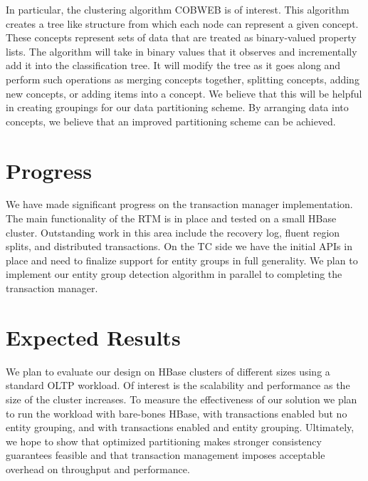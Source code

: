\documentclass[10pt,final,journal]{IEEEtran}
\begin{document}
In particular, the clustering algorithm COBWEB is of interest. This algorithm creates a tree like structure from which each node can represent a given concept. These concepts represent sets of data that are treated as binary-valued property lists. The algorithm will take in binary values that it observes and incrementally add it into the classification tree. It will modify the tree as it goes along and perform such operations as merging concepts together, splitting concepts, adding new concepts, or adding items into a concept. We believe that this will be helpful in creating groupings for our data partitioning scheme. By arranging data into concepts, we believe that an improved partitioning scheme can be achieved.

\section{Progress}
We have made significant progress on the transaction manager implementation. The main functionality of the RTM is in place and tested on a small HBase cluster. Outstanding work in this area include the recovery log, fluent region splits, and distributed transactions. On the TC side we have the initial APIs in place and need to finalize support for entity groups in full generality. We plan to implement our entity group detection algorithm in parallel to completing the transaction manager.

\section{Expected Results}
We plan to evaluate our design on HBase clusters of different sizes using a standard OLTP workload. Of interest is the scalability and performance as the size of the cluster increases. To measure the effectiveness of our solution we plan to run the workload with bare-bones HBase, with transactions enabled but no entity grouping, and with transactions enabled and entity grouping. Ultimately, we hope to show that optimized partitioning makes stronger consistency guarantees feasible and that transaction management imposes acceptable overhead on throughput and performance.



\end{document}
